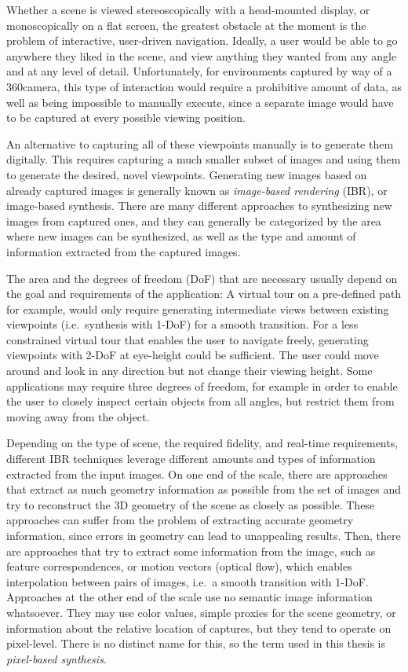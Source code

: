 Whether a scene is viewed stereoscopically with a head-mounted display, or monoscopically on a flat screen, the greatest obstacle at the moment is the problem of interactive, user-driven navigation. Ideally, a user would be able to go anywhere they liked in the scene, and view anything they wanted from any angle and at any level of detail. Unfortunately, for environments captured by way of a 360\degree camera, this type of interaction would require a prohibitive amount of data, as well as being impossible to manually execute, since a separate image would have to be captured at every possible viewing position.

An alternative to capturing all of these viewpoints manually is to generate them digitally. This requires capturing a much smaller subset of images and using them to generate the desired, novel viewpoints. Generating new images based on already captured images is generally known as \emph{image-based rendering} (IBR), or image-based synthesis. There are many different approaches to synthesizing new images from captured ones, and they can generally be categorized by the area where new images can be synthesized, as well as the type and amount of information extracted from the captured images.

The area and the degrees of freedom (DoF) that are necessary usually depend on the goal and requirements of the application: A virtual tour on a pre-defined path for example, would only require generating intermediate views between existing viewpoints (i.e.\ synthesis with 1-DoF) for a smooth transition. For a less constrained virtual tour that enables the user to navigate freely, generating viewpoints with 2-DoF at eye-height could be sufficient. The user could move around and look in any direction but not change their viewing height. Some applications may require three degrees of freedom, for example in order to enable the user to closely inspect certain objects from all angles, but restrict them from moving away from the object.

Depending on the type of scene, the required fidelity, and real-time requirements, different IBR techniques leverage different amounts and types of information extracted from the input images. On one end of the scale, there are approaches that extract as much geometry information as possible from the set of images and try to reconstruct the 3D geometry of the scene as closely as possible. These approaches can suffer from the problem of extracting accurate geometry information, since errors in geometry can lead to unappealing results.
Then, there are approaches that try to extract some information from the image, such as feature correspondences, or motion vectors (optical flow), which enables interpolation between pairs of images, i.e.\ a smooth transition with 1-DoF.
Approaches at the other end of the scale use no semantic image information whatsoever. They may use color values, simple proxies for the scene geometry, or information about the relative location of captures, but they tend to operate on pixel-level. There is no distinct name for this, so the term used in this thesis is \emph{pixel-based synthesis}.

